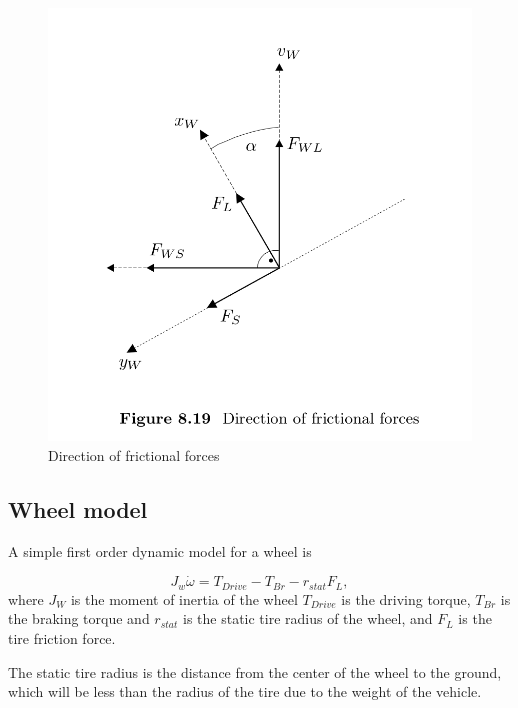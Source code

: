 \begin{figure}
    \centering
    \includegraphics[width=\textwidth]{draft/stolen-figures/direction-of-frictional-forces.png}
    \caption{Direction of frictional forces}
    \label{fig:friction-directions}
\end{figure}



\subsection{Wheel model}

A simple first order dynamic model for a wheel is

\begin{equation}
  J_w \dot{\omega} = T_{Drive} - T_{Br} - r_{stat}F_L,
\end{equation}
where $J_W$ is the moment of inertia of the wheel $T_{Drive}$ is the driving torque, $T_{Br}$ is the braking torque and $r_{stat}$ is the static tire radius of the wheel, and $F_L$ is the tire friction force.

The static tire radius is the distance from the center of the wheel to the ground, which will be less than the radius of the tire due to the weight of the vehicle.











